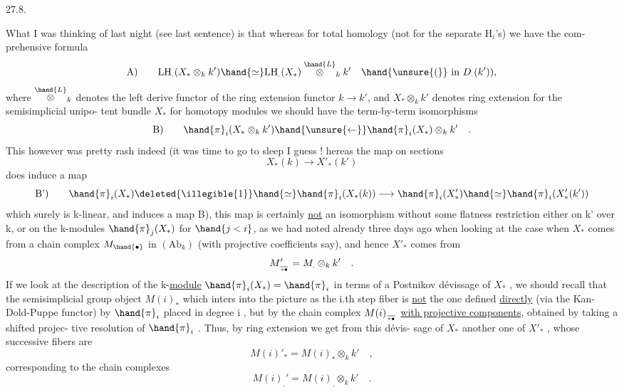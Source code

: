 
27.8.

 What I was thinking of last night (see last sentence) is that
whereas for total homology (not for the separate H$_i$'s) we have the com-%
prehensive formula
\[ \text{A)} \qquad \mathrm{LH}_{.}(X_{*}\otimes_k k')\hand{\simeq}\mathrm{LH}_{.}(X_{*}) \overset{\hand{L}}{\otimes}_k k' \quad \hand{\unsure{(}}\text{ in } D_{.}(k')) , \]
\hand{(}where $\overset{\hand{L}}{\otimes}_k$ denotes the left derive functor of the ring extension functor
 $k\to k'$, and  $X_{*}\otimes_k k'$ denotes ring extension for the semisimplicial unipo-%
tent bundle $X_{*}$\hand{,)} for homotopy modules we should have the term-by-term
isomorphisms
\[ \text{B)} \qquad \hand{\pi}_i(X_{*}\otimes_k k')\hand{\unsure{\leftarrow}}\hand{\pi}_i(X_{*})\otimes_k k' \quad . \]
This however was pretty rash indeed (it was time to go to sleep I guess !\hand{)}
 hereas the map on sections
\[ X_{*}(k)\longrightarrow X'_{*}(k') \]
does induce a map
\[ \text{B')} \qquad \hand{\pi}_i(X_{*})\deleted{\illegible{1}}\hand{\simeq}\hand{\pi}_i(X_{*}(k)) \longrightarrow \hand{\pi}_i(X'_{*})\hand{\simeq}\hand{\pi}_i(X'_{*}(k')) \]
which surely is k-linear, and  induces a map B), this map is certainly
\uline{not} an isomorphism without some flatness restriction either on k' over k,
or on the k-modules $\hand{\pi}_j(X_{*})$ for $\hand{j<i}$, as we had noted already three days
ago when looking at the case when $X_{*}$ comes from a chain complex $M_{\hand{\bullet}}$ in
$(\mathrm{Ab}_k)$ (with projective coefficients say), and hence $X'_{*}$ comes from
\[ M_{\over{*}{\bullet}}' = M_{.}\otimes_k k' \quad . \]
If we look at the description of the k-\uline{module} $\hand{\pi}_i(X_{*}) = \hand{\pi}_i$ in terms of a
Postnikov dévissage of $X_{*}$ , we should recall that the 
semisimplicial group object $M(i)_{*}$ which inters into the picture as the
i.th step fiber is \uline{not} the one defined \uline{directly} (via the Kan-Dold-Puppe
functor) by $\hand{\pi}_i$ placed in degree i , but  by the chain complex 
$M(i)_{\over{*}{\bullet}}$ \uline{with projective components}, obtained by taking  a shifted projec-%
tive resolution of $\hand{\pi}_i$ . Thus, by ring extension we get from this dévis-%
sage of $X_{*}$ another one of $X'_{*}$ , whose successive fibers are
\[ M(i)'_{*} = M(i)_{*}\otimes_k k' \quad , \]
corresponding to the chain complexes
\[ M(i)_{.}' = M(i)_{.}\otimes_k k' \quad . \]

